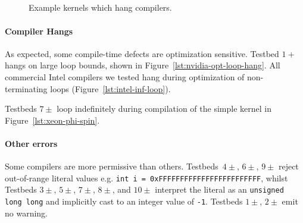 \begin{figure}
  \centering %
  \\%
  \\%
  \\%
  \\%
  \caption{Example kernels which hang compilers.}%
  \vspace{-1.3em}
  \label{lst:compiler-hangs}
\end{figure}

\paragraph{Compiler Hangs}

As expected, some compile-time defects are optimization sensitive. Testbed $1+$
hangs on large loop bounds, shown in Figure~\ref{lst:nvidia-opt-loop-hang}. All
commercial Intel compilers we tested hang during optimization of non-terminating
loops (Figure~\ref{lst:intel-inf-loop}).

Testbeds $7\pm$ loop indefinitely during compilation of the simple kernel in
Figure~\ref{lst:xeon-phi-spin}.

\paragraph{Other errors}

Some compilers are more permissive than others. Testbeds~$4\pm$, $6\pm$, $9\pm$
reject out-of-range literal values e.g. \texttt{int i =
0xFFFFFFFFFFFFFFFFFFFFFFFF}, whilst Testbeds $3\pm$, $5\pm$, $7\pm$, $8\pm$, and
$10\pm$ interpret the literal as an \texttt{unsigned long long} and implicitly
cast to an integer value of \texttt{-1}. Testbeds $1\pm$, $2\pm$ emit no
warning.

